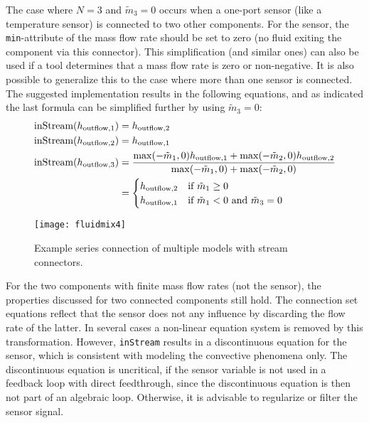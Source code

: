 The case where $N=3$ and $\tilde{m}_3=0$ occurs when a one-port sensor (like a temperature sensor) is connected to two other components.
For the sensor, the \lstinline!min!-attribute of the mass flow rate should be set to zero (no fluid exiting the component via this connector).
This simplification (and similar ones) can also be used if a tool determines that a mass flow rate is zero or non-negative.
It is also possible to generalize this to the case where more than one sensor is connected.
The suggested implementation results in the following equations, and as indicated the last formula can be simplified further by using $\tilde{m}_3=0$:
\begin{align*}
\text{\lstinline!inStream!}(h_{\mathrm{outflow},1}) &= h_{\mathrm{outflow},2}\\
\text{\lstinline!inStream!}(h_{\mathrm{outflow},2}) &= h_{\mathrm{outflow},1}\\
\text{\lstinline!inStream!}(h_{\mathrm{outflow},3}) &= \frac{\operatorname{max}(-\tilde{m}_1,0)h_{\mathrm{outflow},1}+\operatorname{max}(-\tilde{m}_2,0)h_{\mathrm{outflow},2}}{\operatorname{max}(-\tilde{m}_1,0)+\operatorname{max}(-\tilde{m}_2,0)}\\
&=
\begin{cases}
h_{\mathrm{outflow},2}&\text{if $\tilde{m}_1 \geq 0$}\\
h_{\mathrm{outflow},1}&\text{if $\tilde{m}_1 < 0$ and $\tilde{m}_3 = 0$}
\end{cases}
\end{align*}
\begin{figure}[H]
  \begin{center}
    \texttt{[image: fluidmix4]}
  \end{center}
  \caption{%
    Example series connection of multiple models with stream connectors.
  }
\end{figure}

For the two components with finite mass flow rates (not the sensor), the properties discussed for two connected components still hold.
The connection set equations reflect that the sensor does not any influence by discarding the flow rate of the latter.
In several cases a non-linear equation system is removed by this transformation.
However, \lstinline!inStream! results in a discontinuous equation for the sensor, which is consistent with modeling the convective phenomena only.
The discontinuous equation is uncritical, if the sensor variable is not used in a feedback loop with direct feedthrough, since the discontinuous equation is then not part of an algebraic loop.
Otherwise, it is advisable to regularize or filter the sensor signal.

